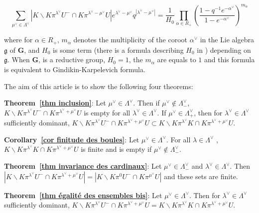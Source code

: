 \documentclass[12pt]{article}
\theoremstyle{plain}
\theoremstyle{definition}
\begin{document}
    
    \begin{equation}\label{eqGK formula}
    \sum_{\mu^\vee\in\Lambda^\vee}|K\backslash K\pi^{\lambda^\vee}U^-\cap
K\pi^{\lambda^\vee-\mu^\vee}U|e^{\lambda^\vee-\mu^\vee}q^{|\lambda^\vee-\mu^\vee|}=\frac{1}{H_0}\prod_{\alpha\in R_+}(\frac{1-q^{-1}e^{-\alpha^\vee}}{1-e^{-\alpha^\vee}})^{m_\alpha}\end{equation}

where for $\alpha\in R_+$, $m_\alpha$ denotes the multiplicity of the coroot $\alpha^\vee$ in the Lie algebra $\mathfrak{g}$ of $\textbf{G}$, and $H_0$ is some  term (there is a formula describing $H_0$ in \cite{braverman2014affine}) depending on $\mathfrak{g}$. When $\textbf{G}$, is a reductive group, $H_0=1$, the $m_\alpha$ are equals to $1$ and this formula is equivalent to Gindikin-Karpelevich formula. 

\bigskip

The aim of this article is to show the following four theorems: 


\medskip

\textbf{Theorem~\ref{thm inclusion}}:
Let $\mu^\vee\in \Lambda^\vee$. Then if $\mu^\vee\notin \Lambda^\vee_-$, $K\backslash K\pi^{\lambda^\vee}U^- \cap K\pi^{\lambda^\vee+\mu^\vee} U$ is empty for all $\lambda^\vee\in \Lambda^\vee$.
 If $\mu^\vee\in \Lambda^\vee_+$, then for $\lambda^\vee\in \Lambda^\vee$ sufficiently
  dominant, $K\backslash K\pi^{\lambda^\vee}U^- \cap K\pi^{\lambda^\vee+\mu^\vee} U\subset K\backslash K\pi^{\lambda^\vee} K\cap K\pi^{\lambda^\vee+\mu^\vee}U$. 

\medskip
\textbf{Corollary~\ref{cor finitude des boules}}:
 Let $\mu^\vee\in \Lambda^\vee$. For all $\lambda\in \Lambda^\vee$ , $ K\backslash K\pi^{\lambda^\vee} K\cap K\pi^{\lambda^\vee+\mu^\vee}U$ is finite and is empty if $\mu^\vee\notin \Lambda^\vee_-$.

\medskip
\textbf{Theorem~\ref{thm invariance des cardinaux}}: 
Let $\mu^\vee\in \Lambda^\vee_-$ and $\lambda^\vee\in \Lambda^\vee$. Then $|K\backslash K\pi^{\lambda^\vee}U^- \cap K\pi^{\lambda^\vee+\mu^\vee} U|=|K\backslash K\pi^{0}U^- \cap K\pi^{\mu^\vee} U|$ and these sets are finite.

\medskip
\textbf{Theorem~\ref{thm égalité des ensembles bis}}:
 Let $\mu^\vee\in \Lambda^\vee$. Then for $\lambda^\vee\in \Lambda^\vee$ sufficiently dominant, $K\backslash K\pi^{\lambda^\vee}U^- \cap K\pi^{\lambda^\vee+\mu^\vee} U= K\backslash K\pi^{\lambda^\vee} K\cap K\pi^{\lambda^\vee+\mu^\vee}U$.

\medskip
\end{document}
